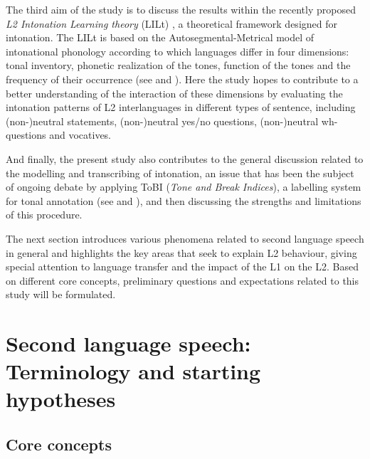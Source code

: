The third aim of the study is to discuss the results within the recently proposed \textit{L2 Intonation Learning theory} (LILt) \citep{Mennen2015}, a theoretical framework designed for intonation. The LILt is based on the Autosegmental-Metrical model of intonational phonology according to which languages differ in four dimensions: tonal inventory, phonetic realization of the tones, function of the tones and the frequency of their occurrence (see  and ). Here the study hopes to contribute to a better understanding of the interaction of these dimensions by evaluating the intonation patterns of L2 interlanguages in different types of sentence, including (non-)neutral statements, (non-)neutral yes/no questions, \mbox{(non-)}neutral wh-questions and vocatives.



And finally, the present study also contributes to the general discussion related to the modelling and transcribing of intonation, an issue that has been the subject of ongoing debate by applying ToBI (\textit{Tone and Break Indices}), a labelling system for tonal annotation (see  and ), and then discussing the strengths and limitations of this procedure.



The next section introduces various phenomena related to second language speech in general and highlights the key areas that seek to explain L2 behaviour, giving special attention to language transfer and the impact of the L1 on the L2. Based on different core concepts, preliminary questions and expectations related to this study will be formulated.


\section{Second language speech: Terminology and starting hypotheses}\label{sec:1.3}
\subsection{Core concepts}\label{sec:1.3.1}

